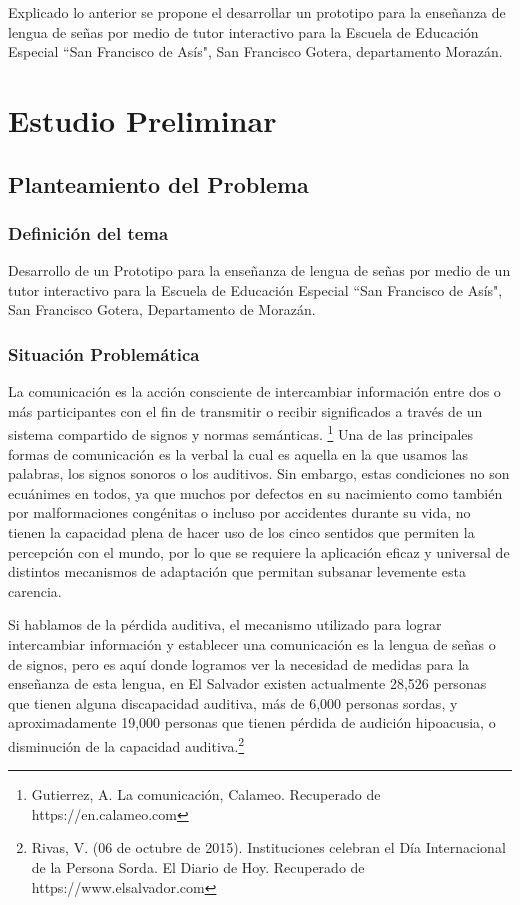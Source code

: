 \documentclass[12pt]{report}%
\begin{document}
Explicado lo anterior se propone el desarrollar un prototipo para la enseñanza de lengua de señas por medio de tutor interactivo para la Escuela  de Educación Especial “San Francisco de Asís", San Francisco Gotera, departamento Morazán. 

\newpage
\chapter{Estudio Preliminar}%
\newpage

\newpage
\section{Planteamiento del Problema}
\subsection{Definición del tema}
Desarrollo de un Prototipo para la enseñanza de lengua de señas por medio de un tutor interactivo para la Escuela de Educación Especial “San Francisco de Asís", San Francisco Gotera, Departamento de Morazán.

\subsection{Situación Problemática}%
La comunicación es la acción consciente de intercambiar información entre dos o más participantes con el fin de transmitir o recibir significados a través de un sistema compartido de signos y normas semánticas. \footnote{ Gutierrez, A. La comunicación, Calameo. Recuperado de https://en.calameo.com}
Una de las principales formas de comunicación es la verbal la cual es aquella en la que usamos las palabras, los signos sonoros o los auditivos. Sin embargo, estas condiciones no son ecuánimes en todos, ya que muchos por defectos en su nacimiento como también por malformaciones congénitas o incluso por accidentes durante su vida, no tienen la capacidad plena de hacer uso de los cinco sentidos que permiten la percepción con el mundo, por lo que se requiere la aplicación eficaz y universal de distintos mecanismos de adaptación que permitan subsanar levemente esta carencia. 

Si hablamos de la pérdida auditiva, el mecanismo utilizado para lograr intercambiar información y establecer una comunicación es la lengua de señas o de signos, pero es aquí donde logramos ver la necesidad de medidas para la enseñanza de esta lengua, en El Salvador existen actualmente 28,526 personas que tienen alguna discapacidad auditiva, más de 6,000 personas sordas, y aproximadamente 19,000 personas que tienen pérdida de audición hipoacusia, o disminución de la capacidad auditiva.\footnote{ Rivas, V. (06 de octubre de 2015). Instituciones celebran el Día Internacional de la Persona Sorda. El Diario de Hoy. Recuperado de https://www.elsalvador.com}
\end{document}
